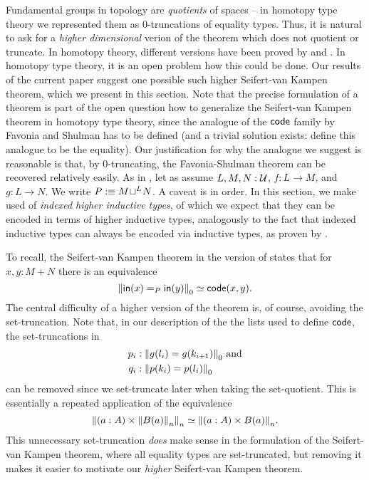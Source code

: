 Fundamental groups in topology are \emph{quotients} of spaces --
in homotopy type theory we represented them as 0-truncations of equality types.
Thus, it is natural to ask for a \emph{higher dimensional} verion of the theorem
which does not quotient or truncate.
In homotopy theory, different versions have been proved by \cite{lurie18derived}
and \cite{brown2011nonabelian}.
In homotopy type theory, it is an open problem how this could be done.
Our results of the current paper suggest one possible such higher Seifert-van Kampen theorem,
which we present in this section.
Note that the precise formulation of a theorem is part of the open question how
to generalize the Seifert-van Kampen theorem in homotopy type theory,
since the analogue of the $\code$ family by Favonia and Shulman has to be defined
(and a trivial solution exists: define this analogue to be the equality).
Our justification for why the analogue we suggest is reasonable is that, by
$0$-truncating, the Favonia-Shulman theorem can be recovered relatively easily.
As in , let as assume $L, M, N : \UU$,
$f : L \to M$, and $g : L \to N$. We write $P :\equiv \pout{L}{M}{N}$.
A caveat is in order.
In this section, we make used of \emph{indexed higher inductive types},
of which we expect that they can be encoded in terms of higher inductive types,
analogously to the fact that indexed inductive types can always be encoded via
inductive types, as proven by \cite{DBLP:journals/jfp/AltenkirchGHMM15,Sattler:indexedW}.

To recall, the Seifert-van Kampen theorem in the version of
\cite{favonia:SvK} states that for $x, y : M + N$ there is an equivalence
\begin{equation*}
\trunc{0}{\inp(x) =_P \inp(y)} \simeq \code(x,y) \text{.}
\end{equation*}
The central difficulty of a higher version of the theorem is, of course,
avoiding the set-truncation.
Note that, in our description of the the lists used to define $\code$,
the set-truncations in 
\begin{align*}
p_i &: \trunc 0 {g(l_i) = g(k_{i+1})} \text{ and} \\
q_i &: \trunc 0 {p(k_i) = p(l_i)}
\end{align*}
can be removed since we set-truncate later
when taking the set-quotient.
This is essentially a repeated application of the equivalence
\begin{equation*}
 \trunc{n}{(a:A) \times \trunc{n}{B(a)}} \simeq \trunc{n}{(a:A) \times B(a)}.
\end{equation*}
This unnecessary set-truncation \emph{does} make sense in the formulation of the
Seifert-van Kampen theorem, where all equality types are set-truncated, but
removing it makes it easier to motivate our \emph{higher} Seifert-van Kampen theorem.

